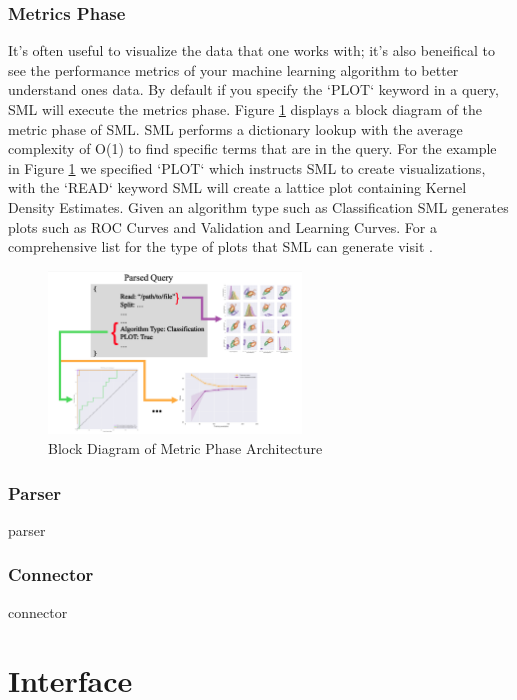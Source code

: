 \documentclass[jair,twoside,11pt,theapa]{article}
\begin{document}
\subsubsection{Metrics Phase}
It's often useful to visualize the data that one works with; it's also beneifical to see the performance metrics of your machine learning algorithm to better understand ones data. By default if you specify the `PLOT` keyword in a query, SML will execute the metrics phase. Figure \ref{fig:metric-phase} displays a block diagram of the metric phase of SML. SML performs a dictionary lookup with the average complexity of O(1) to find specific terms that are in the query. For the example in Figure \ref{fig:metric-phase} we specified `PLOT` which instructs SML to create visualizations, with the `READ` keyword SML will create a lattice plot containing Kernel Density Estimates. Given an algorithm type such as Classification SML generates plots such as ROC Curves and Validation and Learning Curves. For a comprehensive list for the type of plots that SML can generate visit  \cite{}.

\begin{figure}
\includegraphics[width=0.6\textwidth]{figs/metric-phase.png}
\centering
\caption{Block Diagram of Metric Phase Architecture}
\label{fig:metric-phase}
\end{figure}

\subsubsection{Parser}
parser

\subsubsection{Connector}
connector

\section{Interface}
\label{interface}
\end{document}
